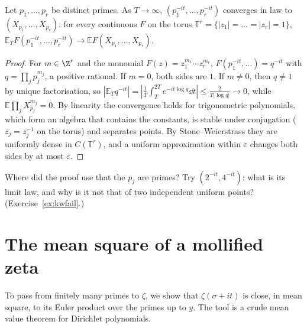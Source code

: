 \begin{lemma}\label{lem:kw}
Let $p_1,\dots,p_r$ be distinct primes. As $T\to\infty$, $(p_1^{-it},\dots,p_r^{-it})$ converges in law to $(X_{p_1},\dots,X_{p_r})$: for every continuous $F$ on the torus $\mathbb T^r=\{|z_1|=\dots=|z_r|=1\}$, $\mathbb E_TF(p_1^{-it},\dots,p_r^{-it})\to\mathbb EF(X_{p_1},\dots,X_{p_r})$.
\end{lemma}
\begin{proof}
For $m\in\Z^r$ and the monomial $F(z)=z_1^{m_1}\cdots z_r^{m_r}$, $F(p_1^{-it},\dots)=q^{-it}$ with $q=\prod_jp_j^{m_j}$, a positive rational. If $m=0$, both sides are $1$. If $m\ne0$, then $q\ne1$ by unique factorisation, so $|\mathbb E_Tq^{-it}|=|\frac1T\int_T^{2T}e^{-it\log q}\dd t|\le\frac2{T|\log q|}\to0$, while $\mathbb E\prod_jX_{p_j}^{m_j}=0$. By linearity the convergence holds for trigonometric polynomials, which form an algebra that contains the constants, is stable under conjugation ($\overline{z_j}=z_j^{-1}$ on the torus) and separates points. By Stone--Weierstrass they are uniformly dense in $C(\mathbb T^r)$, and a uniform approximation within $\varepsilon$ changes both sides by at most $\varepsilon$.
\end{proof}

\begin{think}
Where did the proof use that the $p_j$ are primes? Try $(2^{-it},4^{-it})$: what is its limit law, and why is it not that of two independent uniform points? (Exercise~\ref{ex:kwfail}.)
\end{think}

\section{The mean square of a mollified zeta}

To pass from finitely many primes to $\zeta$, we show that $\zeta(\sigma+it)$ is close, in mean square, to its Euler product over the primes up to $y$. The tool is a crude mean value theorem for Dirichlet polynomials.

